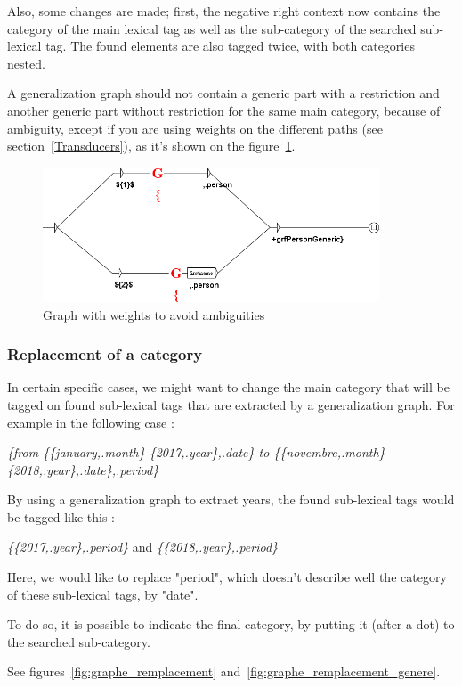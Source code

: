 Also, some changes are made; first, the negative right context now contains the category of the main lexical tag as well as the sub-category of the searched sub-lexical tag. The found elements are also tagged twice, with both categories nested.

\bigskip
A generalization graph should not contain a generic part with a restriction and another generic part without restriction for the same main category, because of ambiguity, except if you are using weights on the different paths (see section~\ref{Transducers}), as it's shown on the figure~\ref{fig:graphe_poids}.

\begin{figure}[!htb]
  \centering
  \includegraphics[width=10cm]{resources/img/graphe_poids.png}
  \caption{Graph with weights to avoid ambiguities}
  \label{fig:graphe_poids}
\end{figure}

\bigskip
\subsubsection{Replacement of a category}
In certain specific cases, we might want to change the main category that will be tagged on found sub-lexical tags that are extracted by a generalization graph. For example in the following case :


\emph{\{from \{\{january,.month\} \{2017,.year\},.date\} to \{\{novembre,.month\} \{2018,.year\},.date\},.period\}}


\bigskip
By using a generalization graph to extract years, the found sub-lexical tags would be tagged like this :


\emph{\{\{2017,.year\},.period\}} and \emph{\{\{2018,.year\},.period\}}

\bigskip
Here, we would like to replace "period", which doesn't describe well the category of these sub-lexical tags, by "date".


To do so, it is possible to indicate the final category, by putting it (after a dot) to the searched sub-category.

\bigskip
See figures~\ref{fig:graphe_remplacement} and~\ref{fig:graphe_remplacement_genere}.


